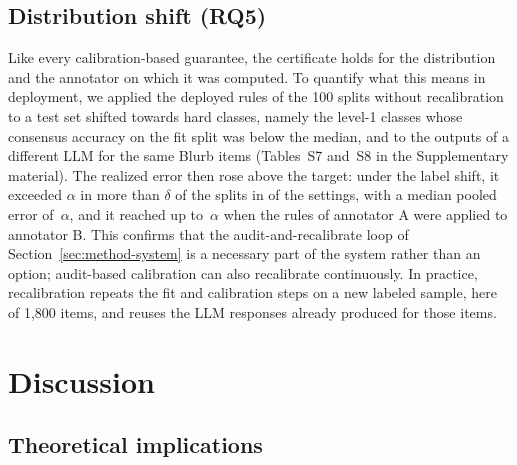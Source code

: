 \documentclass[preprint,12pt]{elsarticle}
\theoremstyle{definition}
\begin{document}
\subsection{Distribution shift (RQ5)}
\label{sec:res-shift}

Like every calibration-based guarantee, the certificate holds for the
distribution and the annotator on which it was computed. To quantify what this
means in deployment, we applied the deployed rules of the 100 splits without
recalibration to a test set shifted towards hard classes, namely the level-1
classes whose consensus accuracy on the fit split was below the median, and to
the outputs of a different LLM for the same Blurb items (Tables~S7 and~S8 in
the Supplementary material). The realized error then rose above the target:
under the label shift, it exceeded $\alpha$ in more than $\delta$ of the
splits in  of the  settings, with a
median pooled error of $\,\alpha$, and it reached
up to $\,\alpha$ when the rules of annotator A were
applied to annotator B. This confirms that the audit-and-recalibrate loop of
Section~\ref{sec:method-system} is a necessary part of the system rather than
an option; audit-based calibration \citep{zhang2026cared} can also recalibrate
continuously. In practice, recalibration repeats the fit and calibration steps
on a new labeled sample, here of 1{,}800 items, and reuses the LLM responses
already produced for those items.

\section{Discussion}
\label{sec:discussion}

\subsection{Theoretical implications}
\label{sec:disc-theory}
\end{document}
